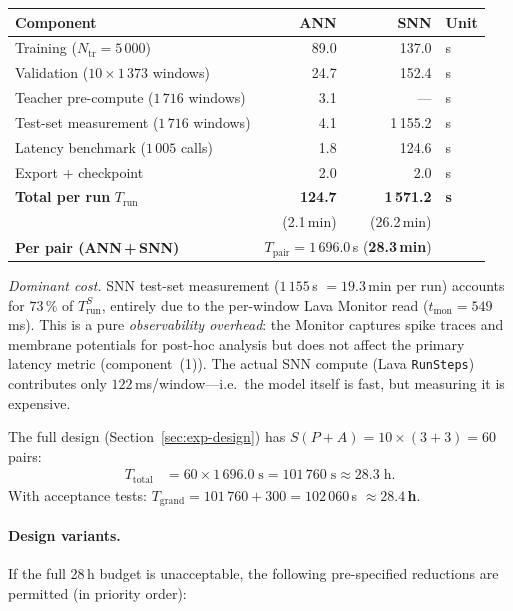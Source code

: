 \documentclass[11pt,a4paper]{article}
\begin{document}
\begin{center}
\renewcommand{\arraystretch}{1.12}
\begin{tabular}{@{}lrrl@{}}
\toprule
\textbf{Component} & \textbf{ANN} & \textbf{SNN} & \textbf{Unit} \\
\midrule
Training ($N_{\text{tr}} = 5\,000$)
  & 89.0 & 137.0 & s \\
Validation ($10 \times 1\,373$ windows)
  & 24.7  & 152.4  & s \\
Teacher pre-compute ($1\,716$ windows)
  & 3.1  & ---   & s \\
Test-set measurement ($1\,716$ windows)
  & 4.1  & 1\,155.2  & s \\
Latency benchmark ($1\,005$ calls)
  & 1.8  & 124.6 & s \\
Export + checkpoint
  & 2.0  & 2.0   & s \\
\midrule
\textbf{Total per run} $T_{\text{run}}$
  & \textbf{124.7} & \textbf{1\,571.2} & \textbf{s} \\
  & (2.1\,min) & (26.2\,min) & \\
\midrule
\textbf{Per pair (ANN\,+\,SNN)} & \multicolumn{2}{c}{$T_{\text{pair}}
  = 1\,696.0$\,s\; (\textbf{28.3\,min})} & \\
\bottomrule
\end{tabular}
\end{center}

\noindent\emph{Dominant cost.}
SNN test-set measurement ($1\,155$\,s $= 19.3$\,min per run) accounts
for $73\,\%$ of $T_{\text{run}}^{S}$, entirely due to the per-window
Lava Monitor read ($t_{\text{mon}} = 549$\,ms).  This is a pure
\emph{observability overhead}: the Monitor captures spike traces and
membrane potentials for post-hoc analysis but does not affect the
primary latency metric (component~(1)).  The actual SNN compute
(Lava \texttt{RunSteps}) contributes only $122$\,ms/window---i.e.\
the model itself is fast, but measuring it is expensive.

\medskip
The full design (Section~\ref{sec:exp-design}) has
$S(P + A) = 10 \times (3 + 3) = 60$ pairs:
\begin{align}
  T_{\text{total}}
    &= 60 \times 1\,696.0\;\text{s}
     = 101\,760\;\text{s}
     \approx 28.3\;\text{h}. \label{eq:time-budget}
\end{align}
With acceptance tests:
$T_{\text{grand}} = 101\,760 + 300 = 102\,060$\,s
$\approx \mathbf{28.4}$\,\textbf{h}.

\paragraph{Design variants.}
If the full 28\,h budget is unacceptable, the following pre-specified
reductions are permitted (in priority order):
\end{document}
